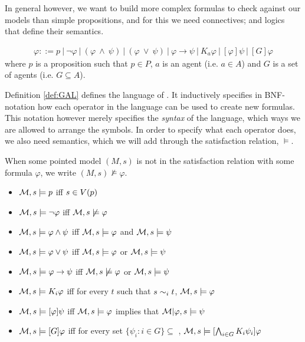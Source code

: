 In general however, we want to build more complex formulas to check against our models than simple propositions, and for this we need connectives; and logics that define their semantics.


\begin{definition} \hfill
	\label{def:GAL}
 	\begin{align*}
		\varphi ::= p \ | ~\neg\varphi ~|~ (\varphi~\wedge~\psi) ~|~ (\varphi~\vee~\psi) ~|~ \varphi 							
		\rightarrow \psi ~|~ K_a\varphi ~|~ [\varphi]\psi  ~|~ [G]\varphi
	\end{align*}
	where $p$ is a proposition such that $p \in P$, $a$ is an agent (i.e. $a \in A$) and $G$ is a set of agents (i.e. $G \subseteq A$).
\end{definition}

Definition \ref{def:GAL} defines the language of . It inductively specifies in BNF-notation how each operator in the language can be used to create new formulas. This notation however merely specifies the \textit{syntax} of the language, which ways we are allowed to arrange the symbols. In order to specify what each operator does, we also need semantics, which we will add through the satisfaction relation, $\models$. 

When some pointed model $(M,s)$ is not in the satisfaction relation with some formula $\varphi$, we write $(M,s)\not\models\varphi$.

\begin{definition} \hfill
	\label{def:GALsem}
	\begin{itemize}
		\item[] $\mathcal{M},s \models p $ iff $ s \in V(p)$
		\item[] $\mathcal{M},s \models \neg\varphi$ iff $ \mathcal{M},s \not\models \varphi$
		\item[] $\mathcal{M},s \models \varphi \wedge \psi $ iff $ \mathcal{M},s \models \varphi $ and $ \mathcal{M},s \models \psi$
		\item[] $\mathcal{M},s \models \varphi \vee \psi $ iff $ \mathcal{M},s \models \varphi $ or $ \mathcal{M},s \models \psi$
		\item[] $\mathcal{M},s \models \varphi \rightarrow \psi $ iff $ \mathcal{M},s \not\models \varphi $ or $ \mathcal{M},s \models \psi$
		\item[] $\mathcal{M},s \models K_i\varphi $ iff for every $t$ such that $s\sim_{i}t$, $\mathcal{M},s \models \varphi$
		\item[] $\mathcal{M},s \models [\varphi]\psi $ iff $ \mathcal{M},s \models \varphi $ implies that $ \mathcal{M}|\varphi,s \models \psi$
		\item[] $\mathcal{M},s \models [G]\varphi $ iff for every set $\{\psi_i: i \in G\} \subseteq $ , $ \mathcal{M},s \models [\bigwedge_{i\in G}K_i\psi_i]\varphi$ 
	\end{itemize}
\end{definition}

